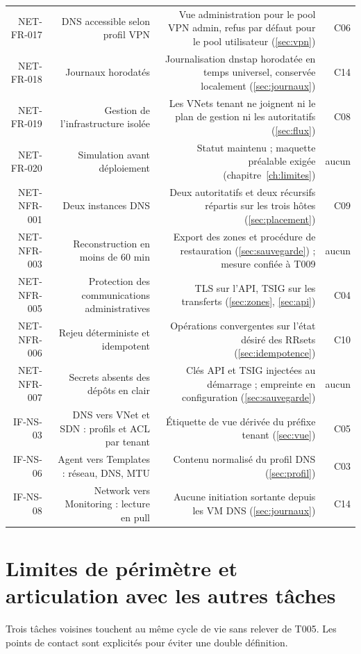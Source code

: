 \begin{longtable}{@{}R{0.16}R{0.18}R{0.50}R{0.16}@{}}
NET-FR-017 & DNS accessible selon profil VPN & Vue administration pour le pool
  VPN admin, refus par défaut pour le pool utilisateur (\ref{sec:vpn}) & C06\\
NET-FR-018 & Journaux horodatés & Journalisation dnstap horodatée en temps
  universel, conservée localement (\ref{sec:journaux}) & C14\\
NET-FR-019 & Gestion de l'infrastructure isolée & Les VNets tenant ne joignent
  ni le plan de gestion ni les autoritatifs (\ref{sec:flux}) & C08\\
NET-FR-020 & Simulation avant déploiement & Statut 
  maintenu ; maquette préalable exigée (chapitre~\ref{ch:limites}) & aucun\\
NET-NFR-001 & Deux instances DNS & Deux autoritatifs et deux récursifs répartis
  sur les trois hôtes (\ref{sec:placement}) & C09\\
NET-NFR-003 & Reconstruction en moins de 60 min & Export des zones et procédure
  de restauration (\ref{sec:sauvegarde}) ; mesure confiée à T009 & aucun\\
NET-NFR-005 & Protection des communications administratives & TLS sur l'API,
  TSIG sur les transferts (\ref{sec:zones}, \ref{sec:api}) & C04\\
NET-NFR-006 & Rejeu déterministe et idempotent & Opérations convergentes sur
  l'état désiré des RRsets (\ref{sec:idempotence}) & C10\\
NET-NFR-007 & Secrets absents des dépôts en clair & Clés API et TSIG injectées
  au démarrage ; empreinte en configuration (\ref{sec:sauvegarde}) & aucun\\
IF-NS-03 & DNS vers VNet et SDN : profils et ACL par tenant & Étiquette de vue
  dérivée du préfixe tenant (\ref{sec:vue}) & C05\\
IF-NS-06 & Agent vers Templates : réseau, DNS, MTU & Contenu normalisé du
  profil DNS (\ref{sec:profil}) & C03\\
IF-NS-08 & Network vers Monitoring : lecture en pull & Aucune initiation
  sortante depuis les VM DNS (\ref{sec:journaux}) & C14\\
\end{longtable}

\section{Limites de périmètre et articulation avec les autres tâches}

Trois tâches voisines touchent au même cycle de vie sans relever de T005. Les
points de contact sont explicités pour éviter une double définition.

